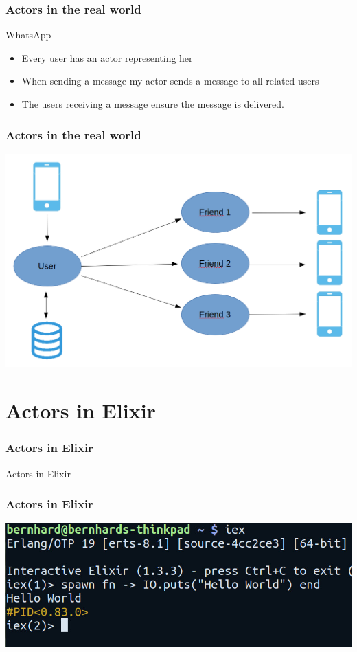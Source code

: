 \documentclass{beamer}
\begin{document}

\begin{frame}
\frametitle{Actors in the real world}
\Huge{WhatsApp}
\Large
\begin{itemize}[<+->]
\item Every user has an actor representing her
\item When sending a message my actor sends a message to all related users
\item The users receiving a message ensure the message is delivered.
\end{itemize}
\end{frame}


\begin{frame}
\frametitle{Actors in the real world}
\includegraphics[width=0.95\linewidth]{./images/whatsapp_actor.png}
\end{frame}


\section{Actors in Elixir}

\begin{frame}
\frametitle{Actors in Elixir}
\Huge{\centerline{Actors in Elixir}}
\end{frame}


\begin{frame}
\frametitle{Actors in Elixir}
\includegraphics[width=1\linewidth]{./images/hello_elixir.jpg}
\end{frame}
\end{document}

